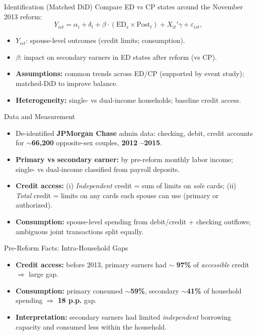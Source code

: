 \documentclass[11pt,notes=hide,aspectratio=169,mathserif]{beamer}
\begin{document}
\begin{frame}{Identification (Matched DiD)}
\small
Compare ED vs CP states around the November 2013 reform:
\[
Y_{ist} = \alpha_i + \delta_t + \beta \cdot (\text{ED}_s \times \text{Post}_t) + X_{it}'\gamma + \varepsilon_{ist},
\]
\begin{itemize}
  \item \(Y_{ist}\): spouse-level outcomes (credit limits; consumption).
  \item \(\beta\): impact on secondary earners in ED states after reform (vs CP).
  \item \textbf{Assumptions:} common trends across ED/CP (supported by event study); matched-DiD to improve balance.
  \item \textbf{Heterogeneity:} single- vs dual-income households; baseline credit access.
\end{itemize}
\end{frame}

\begin{frame}{Data and Measurement}
\small
\begin{itemize}
  \item De-identified \textbf{JPMorgan Chase} admin data: checking, debit, credit accounts for \(\sim\)\textbf{66,200} opposite-sex couples, \textbf{2012 –2015}.
  \item \textbf{Primary vs secondary earner:} by pre-reform monthly labor income; single- vs dual-income classified from payroll deposits.
  \item \textbf{Credit access:} (i) \emph{Independent} credit = sum of limits on \emph{sole} cards; (ii) \emph{Total} credit = limits on any cards each spouse can use (primary or authorized).
  \item \textbf{Consumption:} spouse-level spending from debit/credit + checking outflows; ambiguous joint transactions split equally.
\end{itemize}
\end{frame}

\begin{frame}{Pre-Reform Facts: Intra-Household Gaps}
\small
\begin{itemize}
  \item \textbf{Credit access:} before 2013, primary earners had \(\sim\) \textbf{97\%} of \emph{accessible} credit \(\Rightarrow\) large gap.
  \item \textbf{Consumption:} primary consumed \(\sim\)\textbf{59\%}, secondary \(\sim\)\textbf{41\%} of household spending \(\Rightarrow\) \textbf{18 p.p.} gap.
  \item \textbf{Interpretation:} secondary earners had limited \emph{independent} borrowing capacity and consumed less within the household.
\end{itemize}
\end{frame}
\end{document}
